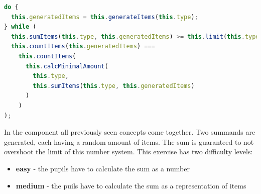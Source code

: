 \begin{lstlisting}[language=TypeScript,caption={Generate a reducable item configuration},label={lst:reducableItems}]
do {
  this.generatedItems = this.generateItems(this.type);
} while (
  this.sumItems(this.type, this.generatedItems) >= this.limit(this.type) ||
  this.countItems(this.generatedItems) ===
    this.countItems(
      this.calcMinimalAmount(
        this.type,
        this.sumItems(this.type, this.generatedItems)
      )
    )
);
\end{lstlisting}

In the  component all previously seen concepts come together. Two summands are generated, each having a random amount of items. The sum is guaranteed to not overshoot the limit of this number system. This exercise has two difficulty levels:

\begin{itemize}
  \item \textbf{easy} - the pupils have to calculate the sum as a number 
  \item \textbf{medium} - the puils have to calculate the sum as a representation of items
\end{itemize}
